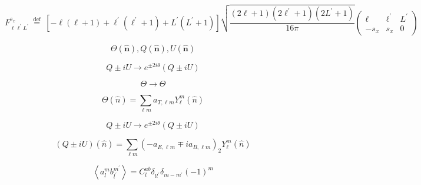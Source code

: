 \documentclass[12pt, notitlepage, onecolumn, amsmath, amssymb, aps]{revtex4-1}
\title{}
\begin{document}
\begin{equation}
  F_{\ell \ell^{\prime} L^{\prime}}^{s_{x}} \stackrel{\text { def }}{=}\left[-\ell\left(\ell+1\right)+\ell^{\prime}\left(\ell^{\prime}+1\right)+L^{\prime}\left(L^{\prime}+1\right)\right] \sqrt{\frac{\left(2 \ell+1\right)\left(2 \ell^{\prime}+1\right)\left(2 L^{\prime}+1\right)}{16 \pi}}\left(\begin{array}{ccc}{\ell} & {\ell^{\prime}} & {L^{\prime}} \\ {-s_{x}} & {s_{x}} & {0}\end{array}\right)
\end{equation}

\begin{equation}
  \Theta(\hat{\mathbf{n}}), Q(\hat{\mathbf{n}}), U(\hat{\mathbf{n}})
\end{equation}

\begin{equation}
  Q \pm i U \rightarrow e^{\pm 2 i \theta}(Q \pm i U)
\end{equation}

\begin{equation}
  \Theta \rightarrow \Theta
\end{equation}

\begin{equation}
  \Theta(\hat{n})=\sum_{\ell m}a_{T, \ell m} Y_{\ell}^{m}(\hat{n})
\end{equation}

\begin{equation}
  Q \pm i U \rightarrow e^{\pm 2 i \theta}(Q \pm i U)
\end{equation}

\begin{equation}
  (Q \pm i U)(\hat{n})=\sum_{\ell m}\left(-a_{E, \ell m} \mp i a_{B, \ell m}\right)_{2} Y_{\ell}^{m}(\hat{n})
\end{equation}

\begin{equation}
  \left\langle a_{l}^{m} b_{l^{\prime}}^{m^{\prime}}\right\rangle=C_{l}^{a b} \delta_{l l^{\prime}} \delta_{m-m^{\prime}}(-1)^{m}
\end{equation}
\end{document}
